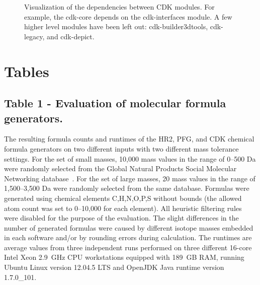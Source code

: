 \documentclass[doublespacing]{bmcart}
\begin{document}
\begin{backmatter}
\begin{figure}[h!]
  \caption{
    Visualization of the dependencies between CDK modules. For example,
    the cdk-core depends on the cdk-interfaces module. A few higher level
    modules have been left out: cdk-builder3dtools, cdk-legacy, and
    cdk-depict.}
  \centering
  \label{fig:deps}
\end{figure}

\begin{figure}[h!]
  \caption{}
  \label{fig:sgroups}
\end{figure}
      





\clearpage

\section*{Tables}


  \subsection*{Table 1 - Evaluation of molecular formula generators.}
  \label{tab:formula_generators}
  The resulting formula counts and runtimes of the HR2, PFG, and CDK chemical
formula generators on two different inputs with two different mass tolerance
settings. For the set of small masses, 10,000 mass values in the range of
0--500 Da were randomly selected from the Global Natural Products Social
Molecular Networking database~\cite{wang2016}. For the set of large masses, 20
mass values in the range of 1,500--3,500 Da were randomly selected from the same
database. Formulas were generated using chemical elements C,H,N,O,P,S without
bounds (the allowed atom count was set to 0--10,000 for each element). All
heuristic filtering rules were disabled for the purpose of the evaluation. The
slight differences in the number of generated formulas were caused by different
isotope masses embedded in each software and/or by rounding errors during
calculation. The runtimes are average values from three independent runs
performed on three different 16-core Intel Xeon 2.9~GHz CPU workstations
equipped with 189~GB RAM, running Ubuntu Linux version 12.04.5 LTS and OpenJDK
Java runtime version 1.7.0\_101.
  \baselineskip


\end{backmatter}
\end{document}
